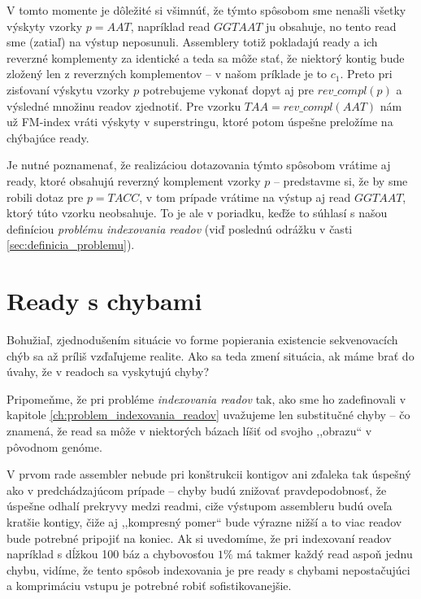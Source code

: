 \begin{example}
V tomto momente je dôležité si všimnúť, že týmto spôsobom sme nenašli všetky výskyty vzorky $p=AAT$, napríklad read $GGTAAT$ ju obsahuje, no tento read sme (zatiaľ) na výstup neposunuli. Assemblery totiž pokladajú ready a ich reverzné komplementy za identické a teda sa môže stať, že niektorý kontig bude zložený len z reverzných komplementov -- v našom príklade je to $c_1$. Preto pri zisťovaní výskytu vzorky $p$ potrebujeme vykonať dopyt aj pre $rev\_compl(p)$ a výsledné množinu readov zjednotiť. Pre vzorku $TAA = rev\_compl(AAT)$ nám už FM-index vráti výskyty v superstringu, ktoré potom úspešne preložíme na chýbajúce ready.

Je nutné poznamenať, že realizáciou dotazovania týmto spôsobom vrátime aj ready, ktoré obsahujú reverzný komplement vzorky $p$ -- predstavme si, že by sme robili dotaz pre $p=TACC$, v tom prípade vrátime na výstup aj read $GGTAAT$, ktorý túto vzorku neobsahuje. To je ale v poriadku, keďže to súhlasí s našou definíciou \emph{problému indexovania readov} (viď poslednú odrážku v časti \ref{sec:definicia_problemu}).

\end{example}

\section{Ready s chybami}
Bohužiaľ, zjednodušením situácie vo forme popierania existencie sekvenovacích chýb sa až príliš vzďaľujeme realite. Ako sa teda zmení situácia, ak máme brať do úvahy, že v readoch sa vyskytujú chyby?

Pripomeňme, že pri probléme \emph{indexovania readov} tak, ako sme ho zadefinovali v kapitole \ref{ch:problem_indexovania_readov} uvažujeme len substitučné chyby -- čo znamená, že read sa môže v niektorých bázach líšiť od svojho ,,obrazu`` v pôvodnom genóme.

V prvom rade assembler nebude pri konštrukcii kontigov ani zďaleka tak úspešný ako v predchádzajúcom prípade -- chyby budú znižovať pravdepodobnosť, že úspešne odhalí prekryvy medzi readmi, ciže výstupom assembleru budú oveľa kratšie kontigy, čiže aj ,,kompresný pomer`` bude výrazne nižší a to viac readov bude potrebné pripojiť na koniec. Ak si uvedomíme, že pri indexovaní readov napríklad s dĺžkou 100 báz a chybovosťou $1\%$ má takmer každý read aspoň jednu chybu, vidíme, že tento spôsob indexovania je pre ready s chybami nepostačujúci a komprimáciu vstupu je potrebné robiť sofistikovanejšie.

